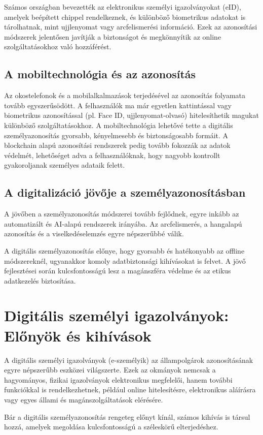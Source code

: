 \documentclass[
]{thesis-ekf}
\theoremstyle{definition}
\theoremstyle{remark}
\begin{document}
	Számos országban bevezették az elektronikus személyi igazolványokat (eID), amelyek beépített chippel rendelkeznek, és különböző biometrikus adatokat is tárolhatnak, mint ujjlenyomat vagy arcfelismerési információ. Ezek az azonosítási módszerek jelentősen javítják a biztonságot és megkönnyítik az online szolgáltatásokhoz való hozzáférést.
	
	\section{A mobiltechnológia és az azonosítás}
	Az okostelefonok és a mobilalkalmazások terjedésével az azonosítás folyamata tovább egyszerűsödött. A felhasználók ma már egyetlen kattintással vagy biometrikus azonosítással (pl. Face ID, ujjlenyomat-olvasó) hitelesíthetik magukat különböző szolgáltatásokhoz.
	A mobiltechnológia lehetővé tette a digitális személyazonosítás gyorsabb, kényelmesebb és biztonságosabb formáit. A blockchain alapú azonosítási rendszerek pedig tovább fokozzák az adatok védelmét, lehetőséget adva a felhasználóknak, hogy nagyobb kontrollt gyakoroljanak személyes adataik felett.
	
	\section{A digitalizáció jövője a személyazonosításban}
	A jövőben a személyazonosítás módszerei tovább fejlődnek, egyre inkább az automatizált és AI-alapú rendszerek irányába. Az arcfelismerés, a hangalapú azonosítás és a viselkedéselemzés egyre népszerűbbé válik.
	
	A digitális személyazonosítás előnye, hogy gyorsabb és hatékonyabb az offline módszereknél, ugyanakkor komoly adatbiztonsági kihívásokat is felvet. A jövő fejlesztései során kulcsfontosságú lesz a magánszféra védelme és az etikus adatkezelés biztosítása.
	
	\chapter{Digitális személyi igazolványok: Előnyök és kihívások}
	A digitális személyi igazolványok (e-személyik) az állampolgárok azonosításának egyre népszerűbb eszközei világszerte. Ezek az okmányok nemcsak a hagyományos, fizikai igazolványok elektronikus megfelelői, hanem további funkciókkal is rendelkezhetnek, például online hitelesítésre, elektronikus aláírásra vagy egyes állami és magánszolgáltatások elérésére.
	
	Bár a digitális személyazonosítás rengeteg előnyt kínál, számos kihívás is társul hozzá, amelyek megoldása kulcsfontosságú a széleskörű elterjedéshez.
\end{document}
